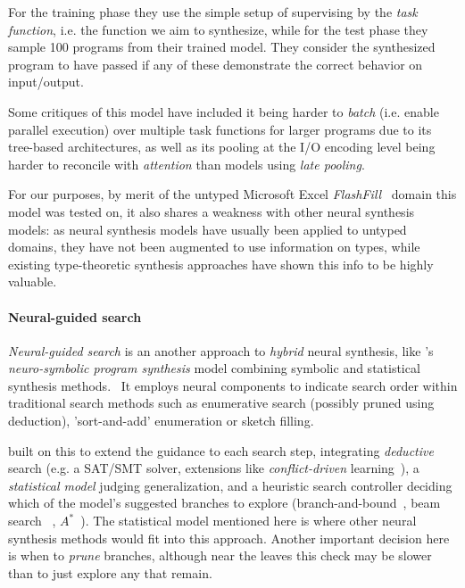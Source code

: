 \documentclass{article}
\begin{document}
For the training phase they use the simple setup of supervising by the \emph{task function},
i.e. the function we aim to synthesize,
while for the test phase they sample 100 programs from their trained model.
They consider the synthesized program to have passed if any of these demonstrate the correct behavior on input/output.


Some critiques of this model have included it being harder to \emph{batch} (i.e. enable parallel execution) over multiple task functions for larger programs due to its tree-based architectures,
as well as its pooling at the I/O encoding level being harder to reconcile with \emph{attention} than models using \emph{late pooling}.~\citep{devlin2017robustfill}

For our purposes, by merit of the untyped Microsoft Excel \emph{FlashFill}~\citep{prose} domain this model was tested on,
it also shares a weakness with other neural synthesis models:
as neural synthesis models have usually been applied to untyped domains,
they have not been augmented to use information on types,
while existing type-theoretic synthesis approaches have shown this info to be highly valuable.

\paragraph{Neural-guided search} \label{sec:ngs}

\emph{Neural-guided search} is an another approach to \emph{hybrid} neural synthesis,
like \citet{nsps}'s \emph{neuro-symbolic program synthesis} model combining symbolic and statistical synthesis methods.~\citep{nps}
It employs neural components to indicate search order within traditional search methods
such as enumerative search (possibly pruned using deduction),
'sort-and-add' enumeration or sketch filling.~\citep{deepcoder}

\citet{kalyan2018neural} built on this to extend the guidance to each search step,
integrating \emph{deductive} search (e.g. a SAT/SMT solver, extensions
like \emph{conflict-driven} learning~\citep{feng2018program}),
a \emph{statistical model} judging generalization,
and a heuristic search controller deciding which of the model's suggested branches
to explore (branch-and-bound~\citep{kalyan2018neural}, beam search%
~\citep{polosukhin2018neural}, $A^{*}$~\citep{lee2018accelerating}).
The statistical model mentioned here is where other
neural synthesis methods would fit into this approach.
Another important decision here is when to \emph{prune} branches,
although near the leaves this check may be slower
than to just explore any that remain.~\citep{polozov}
\end{document}
